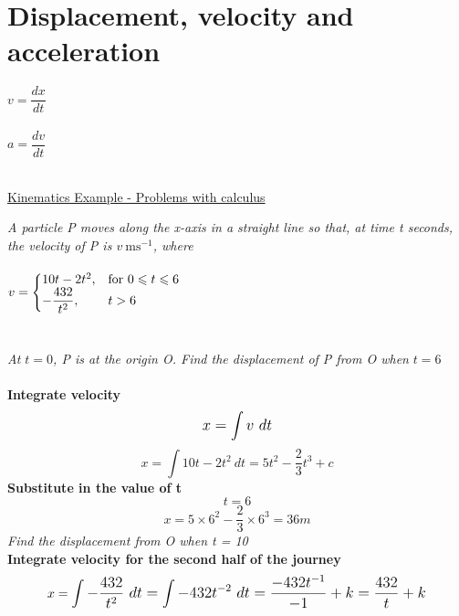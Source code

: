 \documentclass{article}[18pt]
\begin{document}
\section{Displacement, velocity and acceleration}
$v=\dfrac{dx}{dt}$\\
\\
$a=\dfrac{dv}{dt}$\\
\\
\begin{center}
\end{center}
\newpage
\begin{center}
\underline{\huge Kinematics Example - Problems with calculus}
\end{center}
\textit{A particle P moves along the x-axis in a straight line so that, at time t seconds, the velocity of P is $v \ \text{ms}^{-1}$, where}\\
\\
$
  v=\left\{
  \begin{array}{@{}ll@{}}
    10t-2t^2, & \text{for}\ 0\leqslant t \leqslant 6  \\
    -\dfrac{432}{t^2}, & t>6
  \end{array}\right.
$\\
\\
\\
\textit{At $t = 0$, P is at the origin O. Find the displacement of P from O when} $\mathit{t = 6}$\\
\\
\textbf{Integrate velocity}
\textcolor{red}{$$\mathlarger{x=\int v \ dt}$$}
$$x=\int 10t-2t^2 \ dt= 5t^2-\frac{2}{3}t^3+c$$
\textbf{Substitute in the value of t}
$$t=6$$
$$x=5\times6^2-\frac{2}{3}\times6^3=36m$$
\textit{Find the displacement from O when t = 10}\\
\textbf{Integrate velocity for the second half of the journey}
$$x=\mathlarger{\int-\dfrac{432}{t^2} \ dt=\int-432t^{-2} \ dt=\dfrac{-432t^{-1}}{-1}+k=\dfrac{432}{t}+k}$$
\end{document}

